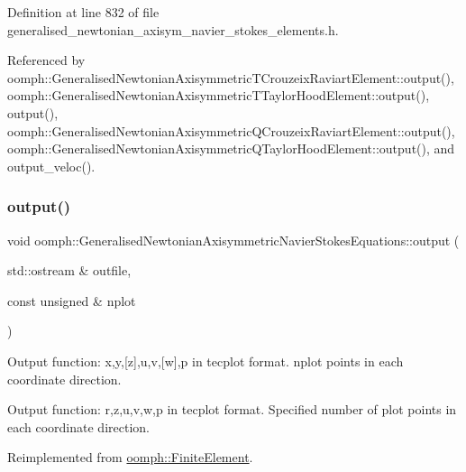 Definition at line 832 of file generalised\+\_\+newtonian\+\_\+axisym\+\_\+navier\+\_\+stokes\+\_\+elements.\+h.



Referenced by oomph\+::\+Generalised\+Newtonian\+Axisymmetric\+T\+Crouzeix\+Raviart\+Element\+::output(), oomph\+::\+Generalised\+Newtonian\+Axisymmetric\+T\+Taylor\+Hood\+Element\+::output(), output(), oomph\+::\+Generalised\+Newtonian\+Axisymmetric\+Q\+Crouzeix\+Raviart\+Element\+::output(), oomph\+::\+Generalised\+Newtonian\+Axisymmetric\+Q\+Taylor\+Hood\+Element\+::output(), and output\+\_\+veloc().

\mbox{\label{classoomph_1_1GeneralisedNewtonianAxisymmetricNavierStokesEquations_a7c80af0c22f64c3484cdeac1edcbe28c}} 
\subsubsection{\texorpdfstring{output()}{output()}\hspace{0.1cm}{\footnotesize\ttfamily [2/4]}}
{\footnotesize\ttfamily void oomph\+::\+Generalised\+Newtonian\+Axisymmetric\+Navier\+Stokes\+Equations\+::output (\begin{DoxyParamCaption}\item[{std\+::ostream \&}]{outfile,  }\item[{const unsigned \&}]{nplot }\end{DoxyParamCaption})\hspace{0.3cm}{\ttfamily [virtual]}}



Output function\+: x,y,\mbox{[}z\mbox{]},u,v,\mbox{[}w\mbox{]},p in tecplot format. nplot points in each coordinate direction. 

Output function\+: r,z,u,v,w,p in tecplot format. Specified number of plot points in each coordinate direction. 

Reimplemented from \hyperlink{classoomph_1_1FiniteElement_afa9d9b2670f999b43e6679c9dd28c457}{oomph\+::\+Finite\+Element}.



